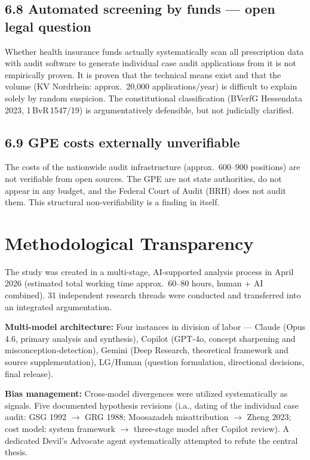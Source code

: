 \documentclass{umbruch-position}
\begin{document}
\subsection*{6.8 Automated screening by funds --- open legal question}

Whether health insurance funds actually systematically scan all prescription data with audit software to generate individual case audit applications from it is not empirically proven. It is proven that the technical means exist and that the volume (KV Nordrhein: approx.\ 20,000 applications/year) is difficult to explain solely by random suspicion. The constitutional classification (BVerfG Hessendata 2023, 1\,BvR\,1547/19) is argumentatively defensible, but not judicially clarified.

\subsection*{6.9 GPE costs externally unverifiable}

The costs of the nationwide audit infrastructure (approx.\ 600--900 positions) are not verifiable from open sources. The GPE are not state authorities, do not appear in any budget, and the Federal Court of Audit (BRH) does not audit them. This structural non-verifiability is a finding in itself.

\section{Methodological Transparency}

The study was created in a multi-stage, AI-supported analysis process in April 2026 (estimated total working time approx.\ 60--80 hours, human + AI combined). 31 independent research threads were conducted and transferred into an integrated argumentation.

\textbf{Multi-model architecture:} Four instances in division of labor --- Claude (Opus 4.6, primary analysis and synthesis), Copilot (GPT-4o, concept sharpening and misconception-detection), Gemini (Deep Research, theoretical framework and source supplementation), LG/Human (question formulation, directional decisions, final release).

\textbf{Bias management:} Cross-model divergences were utilized systematically as signals. Five documented hypothesis revisions (i.a., dating of the individual case audit: GSG 1992 $\to$ GRG 1988; Moosazadeh misattribution $\to$ Zheng 2023; cost model: system framework $\to$ three-stage model after Copilot review). A dedicated Devil's Advocate agent systematically attempted to refute the central thesis.
\end{document}

